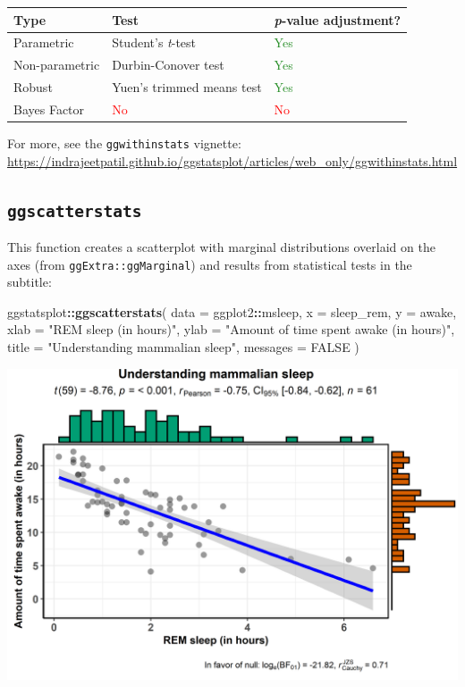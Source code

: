 \documentclass[]{article}
\newenvironment{Shaded}{\begin{snugshade}}{\end{snugshade}}
\newcommand{\DataTypeTok}[1]{\textcolor[rgb]{0.13,0.29,0.53}{#1}}
\newcommand{\KeywordTok}[1]{\textcolor[rgb]{0.13,0.29,0.53}{\textbf{#1}}}
\newcommand{\NormalTok}[1]{#1}
\newcommand{\OperatorTok}[1]{\textcolor[rgb]{0.81,0.36,0.00}{\textbf{#1}}}
\newcommand{\OtherTok}[1]{\textcolor[rgb]{0.56,0.35,0.01}{#1}}
\newcommand{\StringTok}[1]{\textcolor[rgb]{0.31,0.60,0.02}{#1}}
\begin{document}
\begin{longtable}[]{@{}lll@{}}
\toprule
Type & Test & \emph{p}-value adjustment?\tabularnewline
\midrule
\endhead
Parametric & Student's \emph{t}-test &
\textcolor{ForestGreen}{Yes}\tabularnewline
Non-parametric & Durbin-Conover test &
\textcolor{ForestGreen}{Yes}\tabularnewline
Robust & Yuen's trimmed means test &
\textcolor{ForestGreen}{Yes}\tabularnewline
Bayes Factor & \textcolor{red}{No} & \textcolor{red}{No}\tabularnewline
\bottomrule
\end{longtable}

For more, see the \texttt{ggwithinstats} vignette:
\url{https://indrajeetpatil.github.io/ggstatsplot/articles/web_only/ggwithinstats.html}

\hypertarget{ggscatterstats}{%
\subsection{\texorpdfstring{\texttt{ggscatterstats}}{ggscatterstats}}\label{ggscatterstats}}

This function creates a scatterplot with marginal distributions overlaid
on the axes (from \texttt{ggExtra::ggMarginal}) and results from
statistical tests in the subtitle:

\begin{Shaded}
\begin{Highlighting}[]
\NormalTok{ggstatsplot}\OperatorTok{::}\KeywordTok{ggscatterstats}\NormalTok{(}
  \DataTypeTok{data =}\NormalTok{ ggplot2}\OperatorTok{::}\NormalTok{msleep,}
  \DataTypeTok{x =}\NormalTok{ sleep_rem,}
  \DataTypeTok{y =}\NormalTok{ awake,}
  \DataTypeTok{xlab =} \StringTok{"REM sleep (in hours)"}\NormalTok{,}
  \DataTypeTok{ylab =} \StringTok{"Amount of time spent awake (in hours)"}\NormalTok{,}
  \DataTypeTok{title =} \StringTok{"Understanding mammalian sleep"}\NormalTok{,}
  \DataTypeTok{messages =} \OtherTok{FALSE}
\NormalTok{)}
\end{Highlighting}
\end{Shaded}

\includegraphics[width=1\linewidth]{./figures/paper-ggscatterstats1-1}
\end{document}
